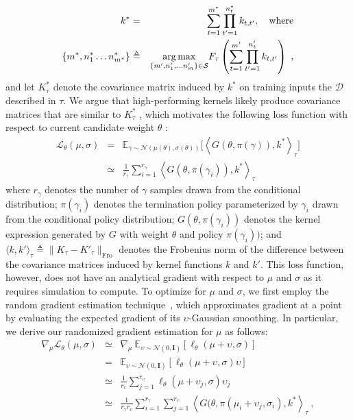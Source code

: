 \begin{eqnarray}
k^\ast &=& \sum_{t=1}^{m^\ast}\prod_{t'=1}^{n^{\ast}_{t}} k_{t, t'}, \quad \text{where} \nonumber \\
\{m^\ast, n^\ast_1 \dots n^\ast_{m^{\ast}}\} &\triangleq& \underset{
 \{m', n'_1, \dots n'_m\} \in \mathcal{S}
}{\operatorname{\arg\max}} F_{\tau}\left(\sum_{t=1}^{m'}\prod_{t'=1}^{n'_{t}} k_{t, t'}\right) \ ,
\end{eqnarray}
and let $K^\ast_{\tau}$ denote the covariance matrix induced by $k^\ast$ on training inputs the ${\mathcal{D}}$ described in $\tau$. We argue that high-performing kernels likely produce covariance matrices that are similar to $K^\ast_{\tau}$ , which motivates the following loss function with respect to current candidate weight $\theta$ :
\begin{eqnarray}
\mathcal{L}_\theta(\mu, \sigma) &=& \mathbb{E}_{\gamma\sim \mathcal{N}(\mu(\theta), \sigma(\theta))}\Big[ \left\langle{G}(\theta, \pi(\gamma)),k^\ast\right\rangle_{\tau}\Big] \nonumber \\
&\simeq& \frac{1}{r_{\gamma}}\sum_{i=1}^{r_{\gamma}} \left\langle{G}(\theta, \pi(\gamma_i)),k^\ast\right\rangle_{\tau}
\end{eqnarray}
where $r_\gamma$ denotes the number of $\gamma$ samples drawn from the conditional distribution; $\pi(\gamma_i)$ denotes the termination policy parameterized by $\gamma_i$ drawn from the conditional policy distribution; $G(\theta, \pi(\gamma_i))$ denotes the kernel expression generated by $G$ with weight $\theta$ and policy $\pi(\gamma_i))$; and $\langle k, k'\rangle_{\tau} \triangleq \|K_{\tau}-K'_{\tau}\|_{\mathrm{Fro}}$ denotes the Frobenius norm of the difference between the covariance matrices induced by kernel functions $k$ and $k'$. This loss function, however, does not have an analytical gradient with respect to $\mu$ and $\sigma$ as it requires simulation to compute. To optimize for $\mu$ and $\sigma$, we first employ the random gradient estimation technique~\cite{nesterov17}, which approximates gradient at a point by evaluating the expected gradient of its $\upsilon$-Gaussian smoothing. In particular, we derive our randomized gradient estimation for $\mu$ as follows:
\begin{eqnarray}
\nabla_{\mu} \mathcal{L}_\theta(\mu, \sigma) &\simeq& \nabla_\mu \  \mathbb{E}_{\upsilon\sim\mathcal{N}(0, \mathbf{I})}\left[\ell_\theta(\mu + \upsilon, \sigma)\right] \nonumber \\
&=& \mathbb{E}_{\upsilon\sim\mathcal{N}(0, \mathbf{I})}\left[\ell_\theta(\mu + \upsilon, \sigma)\upsilon\right] \nonumber \\
&\simeq& \frac{1}{r_\upsilon} \sum_{j=1}^{r_\upsilon} \ell_\theta(\mu + \upsilon_j, \sigma)\upsilon_j \nonumber
\\ 
&\simeq& \frac{1}{r_\gamma r_\upsilon} \sum_{i=1}^{r_\gamma}\sum_{j=1}^{r_\upsilon} \left\langle G(\theta, \pi(\mu_i + \upsilon_j, \sigma_i), k^{\ast} \right\rangle_{\tau} \ ,
\end{eqnarray}
